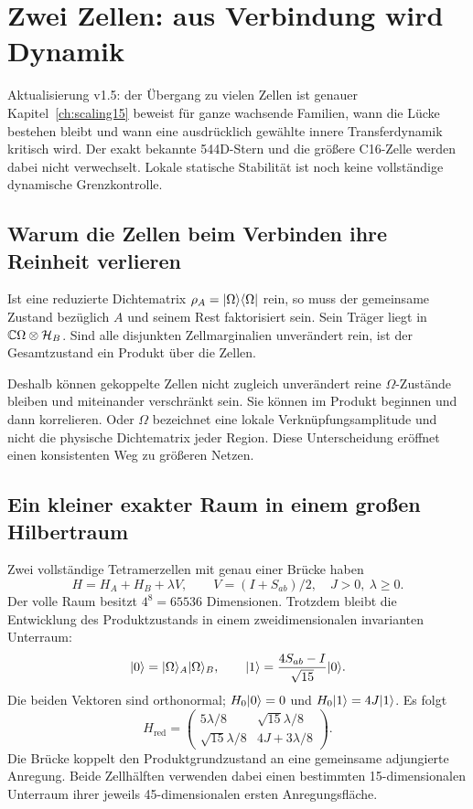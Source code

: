 \chapter{Zwei Zellen: aus Verbindung wird Dynamik}
\label{ch:two}
\begin{bild}{Aktualisierung v1.5: der Übergang zu vielen Zellen ist genauer}
Kapitel~\ref{ch:scaling15} beweist für ganze wachsende Familien, wann die Lücke bestehen bleibt und wann eine ausdrücklich gewählte innere Transferdynamik kritisch wird. Der exakt bekannte 544D-Stern und die größere C16-Zelle werden dabei nicht verwechselt. Lokale statische Stabilität ist noch keine vollständige dynamische Grenzkontrolle.
\end{bild}
\section{Warum die Zellen beim Verbinden ihre Reinheit verlieren}
Ist eine reduzierte Dichtematrix $\rho_A=\lvert\Omega\rangle\langle\Omega\rvert$ rein, so muss der gemeinsame Zustand bezüglich $A$ und seinem Rest faktorisiert sein. Sein Träger liegt in $\mathbb C\Omega\otimes\mathcal H_B$. Sind alle disjunkten Zellmarginalien unverändert rein, ist der Gesamtzustand ein Produkt über die Zellen.

Deshalb können gekoppelte Zellen nicht zugleich unverändert reine $\Omega$-Zustände bleiben und miteinander verschränkt sein. Sie können im Produkt beginnen und dann korrelieren. Oder $\Omega$ bezeichnet eine lokale Verknüpfungsamplitude und nicht die physische Dichtematrix jeder Region. Diese Unterscheidung eröffnet einen konsistenten Weg zu größeren Netzen. 

\section{Ein kleiner exakter Raum in einem großen Hilbertraum}
Zwei vollständige Tetramerzellen mit genau einer Brücke haben
\begin{equation}
H=H_A+H_B+\lambda V,\qquad V=(I+S_{ab})/2,\quad J>0,\ \lambda\ge0.
\end{equation}
Der volle Raum besitzt $4^8=65536$ Dimensionen. Trotzdem bleibt die Entwicklung des Produktzustands in einem zweidimensionalen invarianten Unterraum:
\begin{equation}
\lvert0\rangle=\lvert\Omega\rangle_A\lvert\Omega\rangle_B,\qquad
\lvert1\rangle=\frac{4S_{ab}-I}{\sqrt{15}}\lvert0\rangle.
\end{equation}
Die beiden Vektoren sind orthonormal; $H_0\lvert0\rangle=0$ und $H_0\lvert1\rangle=4J\lvert1\rangle$. Es folgt
\begin{equation}
\boxed{H_{\mathrm{red}}=
\begin{pmatrix}
5\lambda/8&\sqrt{15}\lambda/8\\
\sqrt{15}\lambda/8&4J+3\lambda/8
\end{pmatrix}.}
\label{eq:Hred}
\end{equation}
Die Brücke koppelt den Produktgrundzustand an eine gemeinsame adjungierte Anregung. Beide Zellhälften verwenden dabei einen bestimmten 15-dimensionalen Unterraum ihrer jeweils 45-dimensionalen ersten Anregungsfläche. 

